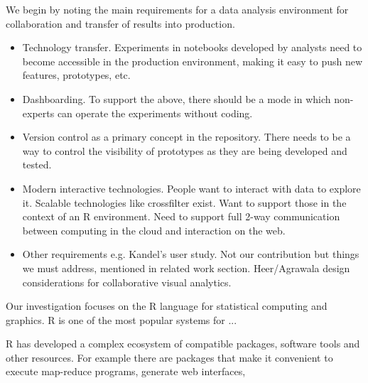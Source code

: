 We begin by noting the main requirements for a data analysis environment for
collaboration and transfer of results into production.

\begin{itemize}
\item Technology transfer. Experiments in notebooks developed by analysts need to become accessible in the production environment, making it easy to push new features, prototypes, etc.
\item Dashboarding. To support the above, there should be a mode in which non-experts
can operate the experiments without coding.
\item Version control as a primary concept in the repository. There needs to be a way to control the visibility of prototypes as they are being developed and tested.
\item Modern interactive technologies. People want to interact with data to explore it. Scalable technologies like crossfilter exist. Want to support those in the context of an R environment. Need to support full 2-way communication between computing in the cloud and interaction on the web.
\item Other requirements e.g. Kandel's user study. Not our contribution but things we must address, mentioned in related work section. Heer/Agrawala design considerations for collaborative visual analytics.
\end{itemize}

Our investigation focuses on the R language \cite{RCoreTeam:2013:R}
for statistical computing and graphics. R is one of the most popular
systems for ...

R has developed a complex ecosystem of compatible packages, software
tools and other resources. For example there are packages that make
it convenient to execute map-reduce programs, generate web interfaces,

